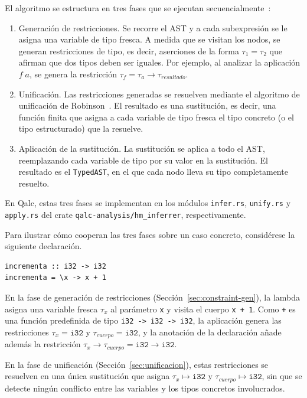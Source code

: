 El algoritmo se estructura en tres fases que se ejecutan secuencialmente~\cite{pierce_tapl_2002}:

\begin{enumerate}
  \item Generación de restricciones. Se recorre el AST y a cada subexpresión se le asigna una variable de tipo fresca. A medida que se visitan los nodos, se generan restricciones de tipo, es decir, aserciones de la forma $\tau_1 = \tau_2$ que afirman que dos tipos deben ser iguales. Por ejemplo, al analizar la aplicación $f\;a$, se genera la restricción $\tau_f = \tau_a \to \tau_{resultado}$.
  \item Unificación. Las restricciones generadas se resuelven mediante el algoritmo de unificación de Robinson~\cite{robinson_1965}. El resultado es una sustitución, es decir, una función finita que asigna a cada variable de tipo fresca el tipo concreto (o el tipo estructurado) que la resuelve.
  \item Aplicación de la sustitución. La sustitución se aplica a todo el AST, reemplazando cada variable de tipo por su valor en la sustitución. El resultado es el \lstinline|TypedAST|, en el que cada nodo lleva su tipo completamente resuelto.
\end{enumerate}

En Qalc, estas tres fases se implementan en los módulos \lstinline|infer.rs|, \lstinline|unify.rs| y \lstinline|apply.rs| del crate \lstinline|qalc-analysis/hm_inferrer|, respectivamente.

Para ilustrar cómo cooperan las tres fases sobre un caso concreto, considérese la siguiente declaración.

\begin{lstlisting}[language={}, caption=Ejemplo de declaración a inferir mediante Hindley-Milner]
incrementa :: i32 -> i32
incrementa = \x -> x + 1
\end{lstlisting}

En la fase de generación de restricciones (Sección~\ref{sec:constraint-gen}), la lambda asigna una variable fresca $\tau_x$ al parámetro \lstinline|x| y visita el cuerpo \lstinline|x + 1|. Como \lstinline|+| es una función predefinida de tipo \lstinline|i32 -> i32 -> i32|, la aplicación genera las restricciones $\tau_x = \mathtt{i32}$ y $\tau_{cuerpo} = \mathtt{i32}$, y la anotación de la declaración añade además la restricción $\tau_x \to \tau_{cuerpo} = \mathtt{i32} \to \mathtt{i32}$.

En la fase de unificación (Sección~\ref{sec:unificacion}), estas restricciones se resuelven en una única sustitución que asigna $\tau_x \mapsto \mathtt{i32}$ y $\tau_{cuerpo} \mapsto \mathtt{i32}$, sin que se detecte ningún conflicto entre las variables y los tipos concretos involucrados.

